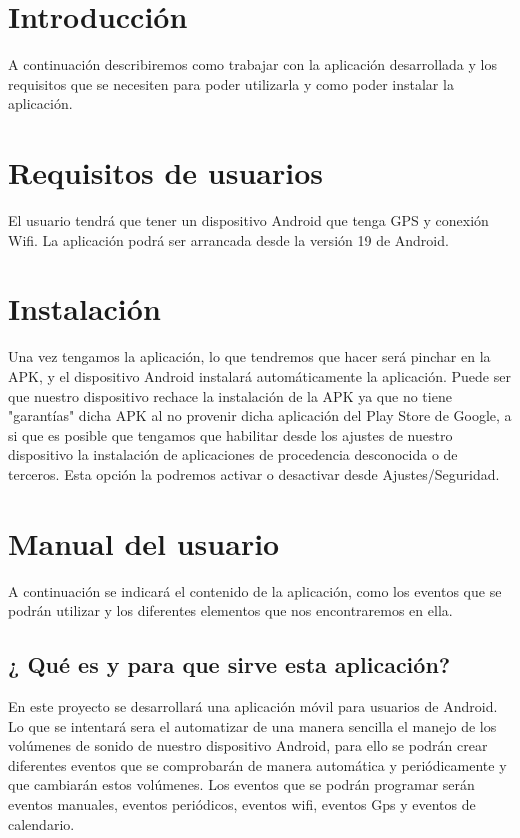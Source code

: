 
\section{Introducción}

A continuación describiremos como trabajar con la aplicación desarrollada y los requisitos que se necesiten para poder utilizarla y como poder instalar la aplicación.
\section{Requisitos de usuarios}
El usuario tendrá que tener un dispositivo Android que tenga GPS y conexión Wifi. La aplicación podrá ser arrancada desde la versión 19 de Android.

\section{Instalación}

Una vez tengamos la aplicación, lo que tendremos que hacer será pinchar en la APK, y el dispositivo Android instalará automáticamente la aplicación. Puede ser que nuestro dispositivo rechace la instalación de la APK ya que no tiene "garantías" dicha APK al no provenir dicha aplicación del Play Store de Google, a si que es posible que tengamos que habilitar desde los ajustes de nuestro dispositivo la instalación de aplicaciones de procedencia desconocida o de terceros. Esta opción la podremos activar o desactivar desde Ajustes/Seguridad.

\section{Manual del usuario}
A continuación se indicará el contenido de la aplicación, como los eventos que se podrán utilizar y los diferentes elementos que nos encontraremos en ella.

\subsection{¿ Qué es y para que sirve esta aplicación?}
En este proyecto se desarrollará una aplicación móvil para usuarios de Android. Lo que se intentará sera el automatizar de una manera sencilla el manejo de los volúmenes de sonido de nuestro dispositivo Android, para ello se podrán crear diferentes eventos que se comprobarán de manera automática y periódicamente y que cambiarán estos volúmenes.
Los eventos que se podrán programar serán eventos manuales, eventos periódicos, eventos wifi, eventos Gps y eventos de calendario.
